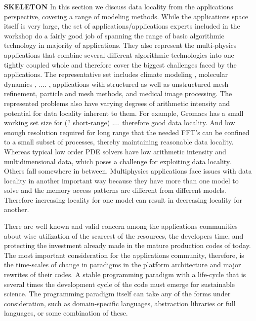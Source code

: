 %
%
$ $\\
\noindent
{\large\textbf{SKELETON}}
In this section we discuss data locality from the applications perspective, covering a range of modeling methods.
While the applications space itself is very large, the set of applications/applications experts included in the workshop do a fairly good job of spanning the range of basic algorithmic technology in majority of applications.
They also represent the multi-physics applications that combine several different algorithmic technologies into one tightly coupled whole and therefore cover the biggest challenges faced by the applications.
The representative set includes climate modeling \cite{cosmo},  molecular dynamics \cite{gromacs}, .... , applications with structured \cite{chombo} as well as unstructured \cite{}  mesh refinement, particle and mesh methods, and medical image processing.
The represented problems also have varying degrees of arithmetic intensity and potential for data locality inherent to them.
For example, Gromacs has a small working set size for (? short-range) .... therefore good data locality.
And low enough resolution required for long range that the needed FFT's can be confined to a small subset of processes, thereby maintaining reasonable data locality.
Whereas typical low order PDE solvers have low arithmetic intensity and multidimensional data, which poses a challenge for exploiting data locality.
Others fall somewhere in between.
Multiphysics applications face issues with data locality in another important way because they have more than one model to solve and the memory access patterns are different from different models.
Therefore increasing locality for one model can result in decreasing locality for another. 

There are well known and valid concern among the applications communities about wise utilization of the scarcest of the resources, the developers time, and protecting the investment already made in the mature production codes of today.
The most important consideration for the applications community, therefore, is the time-scales of change in paradigms in the platform architecture and major rewrites of their codes.
A stable programming paradigm with a life-cycle that is several times the development cycle of the code must emerge for sustainable science.
The programming paradigm itself can take any of the forms under consideration, such as domain-specific languages, abstraction libraries or full languages, or some combination of these. 
 
